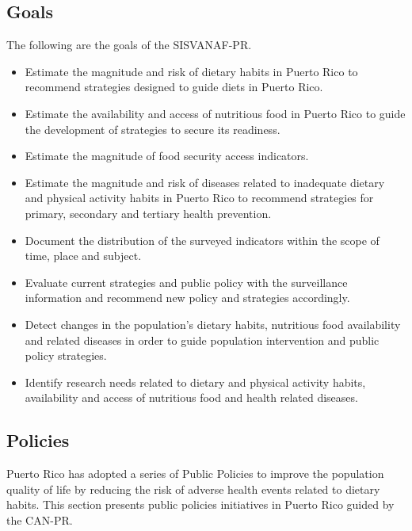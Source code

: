 \documentclass[12pt,letterpaper]{report}
\begin{document}
\subsection{Goals}
The following are the goals of the SISVANAF-PR.

\begin{itemize}

	\item Estimate the magnitude and risk of dietary habits in Puerto Rico to recommend strategies designed to guide diets in Puerto Rico.

	\item Estimate the availability and access of nutritious food in Puerto Rico to guide the development of strategies to secure its readiness.

\item Estimate the magnitude of food security access indicators.  

\item Estimate the magnitude and risk of diseases related to inadequate dietary and physical activity habits in Puerto Rico to recommend strategies for primary, secondary and tertiary health prevention.

\item Document the distribution of the surveyed indicators within the scope of time, place and subject.

\item Evaluate current strategies and public policy with the surveillance information and recommend new policy and strategies accordingly.

\item Detect changes in the population's dietary habits, nutritious food availability and related diseases in order to guide population intervention and public policy strategies.

\item Identify research needs related to dietary and physical activity habits, availability and access of nutritious food and health related diseases.

	\end{itemize}

\subsection{Policies}

Puerto Rico has adopted a series of Public Policies to improve the population quality of life by reducing the risk of adverse health events related to dietary habits.  This section presents public policies initiatives in Puerto Rico guided by the CAN-PR.
\end{document}

